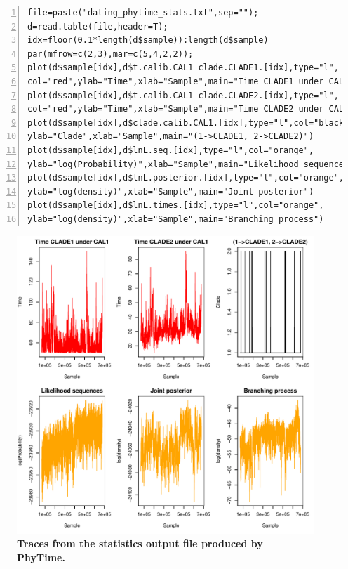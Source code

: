 \documentclass[a4paper,12pt]{article}
\begin{document}
\begin{Verbatim}[frame=single, label=R script to produce traces from the PhyTime statistics file, samepage=true, baselinestretch=0.5,
  fontsize=\small, numbers=left]
file=paste("dating_phytime_stats.txt",sep="");
d=read.table(file,header=T);
idx=floor(0.1*length(d$sample)):length(d$sample)
par(mfrow=c(2,3),mar=c(5,4,2,2));
plot(d$sample[idx],d$t.calib.CAL1_clade.CLADE1.[idx],type="l",
col="red",ylab="Time",xlab="Sample",main="Time CLADE1 under CAL1")
plot(d$sample[idx],d$t.calib.CAL1_clade.CLADE2.[idx],type="l",
col="red",ylab="Time",xlab="Sample",main="Time CLADE2 under CAL1")
plot(d$sample[idx],d$clade.calib.CAL1.[idx],type="l",col="black",
ylab="Clade",xlab="Sample",main="(1->CLADE1, 2->CLADE2)")
plot(d$sample[idx],d$lnL.seq.[idx],type="l",col="orange",
ylab="log(Probability)",xlab="Sample",main="Likelihood sequences")
plot(d$sample[idx],d$lnL.posterior.[idx],type="l",col="orange",
ylab="log(density)",xlab="Sample",main="Joint posterior")
plot(d$sample[idx],d$lnL.times.[idx],type="l",col="orange",
ylab="log(density)",xlab="Sample",main="Branching process")
\end{Verbatim}


\begin{figure}
\begin{center}
\includegraphics[width=13.8cm]{./fig/phytimetrace}
\end{center}
\caption{{\bf Traces from the statistics output file produced by PhyTime.}} 
\label{fig:phytimetrace}
\end{figure}
\end{document}
